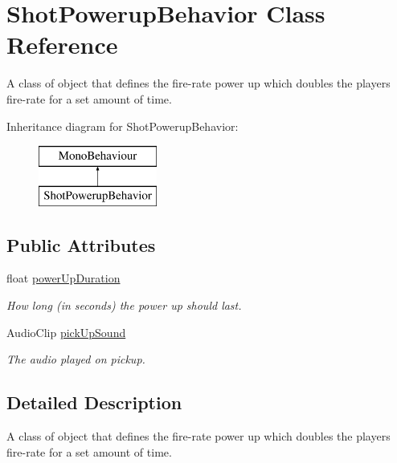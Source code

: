 \hypertarget{class_shot_powerup_behavior}{}\section{Shot\+Powerup\+Behavior Class Reference}
\label{class_shot_powerup_behavior}


A class of object that defines the fire-\/rate power up which doubles the player\textquotesingle{}s fire-\/rate for a set amount of time.  


Inheritance diagram for Shot\+Powerup\+Behavior\+:\begin{figure}[H]
\begin{center}
\leavevmode
\includegraphics[height=2.000000cm]{class_shot_powerup_behavior}
\end{center}
\end{figure}
\subsection*{Public Attributes}
\begin{DoxyCompactItemize}
\item 
float \mbox{\hyperlink{class_shot_powerup_behavior_aae016007c1f9cf0f78fec0278c853666}{power\+Up\+Duration}}
\begin{DoxyCompactList}\small\item\em How long (in seconds) the power up should last. \end{DoxyCompactList}\item 
Audio\+Clip \mbox{\hyperlink{class_shot_powerup_behavior_a0b865b0b14261d875a66d839358408b3}{pick\+Up\+Sound}}
\begin{DoxyCompactList}\small\item\em The audio played on pickup. \end{DoxyCompactList}\end{DoxyCompactItemize}


\subsection{Detailed Description}
A class of object that defines the fire-\/rate power up which doubles the player\textquotesingle{}s fire-\/rate for a set amount of time. 

